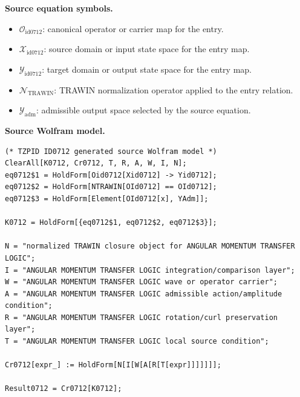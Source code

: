\begin{minipage}[t]{0.49\linewidth}
\begingroup
\small
\raggedright
\textbf{Source equation symbols.}\par
\begin{itemize}[leftmargin=1.35em,itemsep=1pt,topsep=1pt,parsep=0pt]
    \item $\mathcal{O}_{\mathrm{id0712}}$: canonical operator or carrier map for the entry.
    \item $\mathcal{X}_{\mathrm{id0712}}$: source domain or input state space for the entry map.
    \item $\mathcal{Y}_{\mathrm{id0712}}$: target domain or output state space for the entry map.
    \item $\mathcal{N}_{\mathrm{TRAWIN}}$: TRAWIN normalization operator applied to the entry relation.
    \item $\mathcal{Y}_{\mathrm{adm}}$: admissible output space selected by the source equation.
\end{itemize}
\endgroup
\end{minipage}\hfill
\begin{minipage}[t]{0.47\linewidth}
\begingroup
\scriptsize
\raggedright
\textbf{Source Wolfram model.}\par
\begin{Verbatim}[fontsize=\tiny,breaklines=true,breakanywhere=true]
(* TZPID ID0712 generated source Wolfram model *)
ClearAll[K0712, Cr0712, T, R, A, W, I, N];
eq0712$1 = HoldForm[Oid0712[Xid0712] -> Yid0712];
eq0712$2 = HoldForm[NTRAWIN[OId0712] == OId0712];
eq0712$3 = HoldForm[Element[OId0712[x], YAdm]];

K0712 = HoldForm[{eq0712$1, eq0712$2, eq0712$3}];

N = "normalized TRAWIN closure object for ANGULAR MOMENTUM TRANSFER LOGIC";
I = "ANGULAR MOMENTUM TRANSFER LOGIC integration/comparison layer";
W = "ANGULAR MOMENTUM TRANSFER LOGIC wave or operator carrier";
A = "ANGULAR MOMENTUM TRANSFER LOGIC admissible action/amplitude condition";
R = "ANGULAR MOMENTUM TRANSFER LOGIC rotation/curl preservation layer";
T = "ANGULAR MOMENTUM TRANSFER LOGIC local source condition";

Cr0712[expr_] := HoldForm[N[I[W[A[R[T[expr]]]]]]];

Result0712 = Cr0712[K0712];
\end{Verbatim}
\endgroup
\end{minipage}

